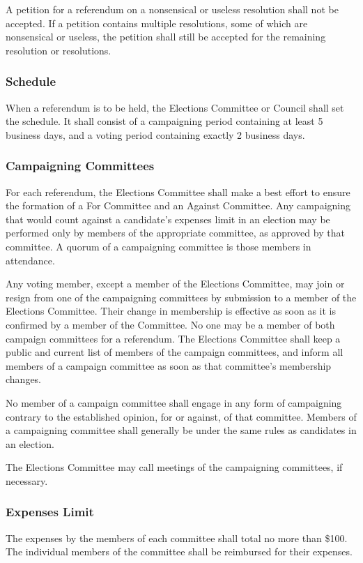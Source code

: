 A petition for a referendum on a nonsensical or useless resolution shall not be accepted.
If a petition contains multiple resolutions, some of which are nonsensical or useless, the petition shall still be accepted for the remaining resolution or resolutions.

\subsubsection{Schedule}
When a referendum is to be held, the Elections Committee or Council shall set the schedule.
It shall consist of a campaigning period containing at least 5 business days, and a voting period containing exactly 2 business days.

\subsubsection{Campaigning Committees}
For each referendum, the Elections Committee shall make a best effort to ensure the formation of a For Committee and an Against Committee.
Any campaigning that would count against a candidate's expenses limit in an election may be performed only by members of the appropriate committee, as approved by that committee.
A quorum of a campaigning committee is those members in attendance.

Any voting member, except a member of the Elections Committee, may join or resign from one of the campaigning committees by submission to a member of the Elections Committee.
Their change in membership is effective as soon as it is confirmed by a member of the Committee.
No one may be a member of both campaign committees for a referendum.
The Elections Committee shall keep a public and current list of members of the campaign committees, and inform all members of a campaign committee as soon as that committee's membership changes.

No member of a campaign committee shall engage in any form of campaigning contrary to the established opinion, for or against, of that committee.
Members of a campaigning committee shall generally be under the same rules as candidates in an election.

The Elections Committee may call meetings of the campaigning committees, if necessary.

\subsubsection{Expenses Limit}
The expenses by the members of each committee shall total no more than \$100.
The individual members of the committee shall be reimbursed for their expenses.
